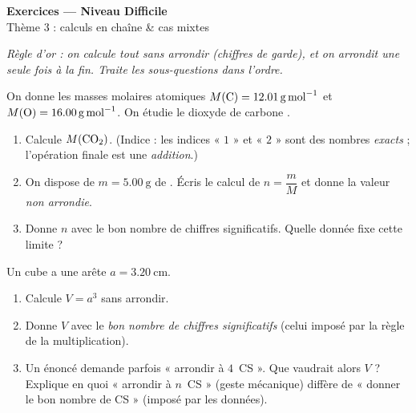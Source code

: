 \documentclass[11pt,a4paper]{article}
\newcommand{\CS}{chiffres significatifs}
\begin{document}
\begin{center}
{\Large\bfseries\color{primarydark} Exercices — Niveau Difficile}\\[1pt]
{\color{primary} Thème 3 : calculs en chaîne \& cas mixtes}
\end{center}
\vspace{1mm}
\textit{Règle d'or : on calcule tout sans arrondir (chiffres de garde), et on arrondit une seule fois
à la fin. Traite les sous-questions dans l'ordre.}
\vspace{2mm}

\begin{exo}
On donne les masses molaires atomiques $M(\ce{C})=\qty{12,01}{\gram\per\mole}$ et
$M(\ce{O})=\qty{16,00}{\gram\per\mole}$. On étudie le dioxyde de carbone .
\begin{enumerate}[label=\alph*),leftmargin=1.6em,itemsep=1pt]
  \item Calcule $M(\ce{CO2})$. (Indice : les indices « $1$ » et « $2$ » sont des nombres \emph{exacts} ;
        l'opération finale est une \emph{addition}.)
  \item On dispose de $m = \qty{5,00}{\gram}$ de . Écris le calcul de $n = \dfrac{m}{M}$ et
        donne la valeur \emph{non arrondie}.
  \item Donne $n$ avec le bon nombre de \CS. Quelle donnée fixe cette limite ?
\end{enumerate}
\end{exo}

\begin{exo}
Un cube a une arête $a = \qty{3,20}{\centi\metre}$.
\begin{enumerate}[label=\alph*),leftmargin=1.6em,itemsep=1pt]
  \item Calcule $V = a^{3}$ sans arrondir.
  \item Donne $V$ avec le \emph{bon nombre de \CS} (celui imposé par la règle de la multiplication).
  \item Un énoncé demande parfois « arrondir à $4$~CS ». Que vaudrait alors $V$ ? Explique en quoi
        « arrondir à $n$~CS » (geste mécanique) diffère de « donner le bon nombre de CS » (imposé par
        les données).
\end{enumerate}
\end{exo}
\end{document}
